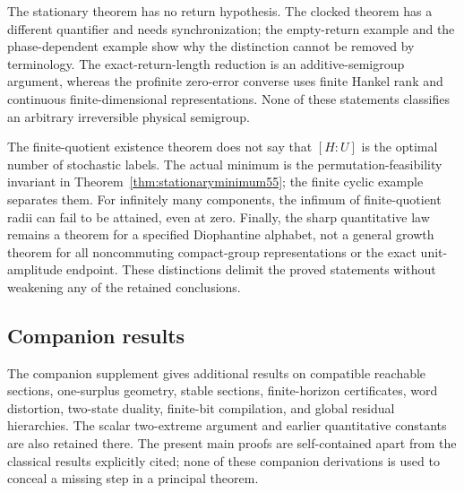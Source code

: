 The stationary theorem has no return hypothesis. The clocked theorem has a different quantifier and needs synchronization; the empty-return example and the phase-dependent example show why the distinction cannot be removed by terminology. The exact-return-length reduction is an additive-semigroup argument, whereas the profinite zero-error converse uses finite Hankel rank and continuous finite-dimensional representations. None of these statements classifies an arbitrary irreversible physical semigroup.

The finite-quotient existence theorem does not say that $[H:U]$ is the optimal number of stochastic labels. The actual minimum is the permutation-feasibility invariant in Theorem~\ref{thm:stationaryminimum55}; the finite cyclic example separates them. For infinitely many components, the infimum of finite-quotient radii can fail to be attained, even at zero. Finally, the sharp quantitative law remains a theorem for a specified Diophantine alphabet, not a general growth theorem for all noncommuting compact-group representations or the exact unit-amplitude endpoint. These distinctions delimit the proved statements without weakening any of the retained conclusions.

\subsection{Companion results}
The companion supplement gives additional results on compatible reachable sections, one-surplus geometry, stable sections, finite-horizon certificates, word distortion, two-state duality, finite-bit compilation, and global residual hierarchies. The scalar two-extreme argument and earlier quantitative constants are also retained there. The present main proofs are self-contained apart from the classical results explicitly cited; none of these companion derivations is used to conceal a missing step in a principal theorem.
